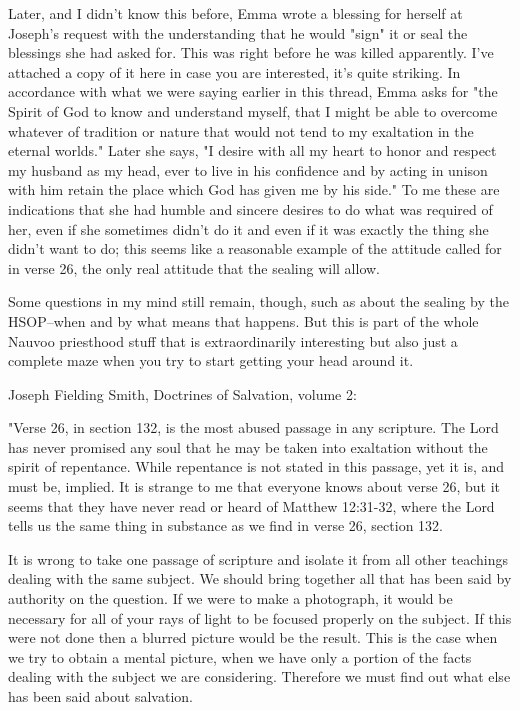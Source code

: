 \begin{compactdesc}
\begin{compactdesc}
					Later, and I didn't know this before, Emma wrote a blessing for herself at Joseph's request with the understanding that he would "sign" it or seal the blessings she had asked for. This was right before he was killed apparently. I've attached a copy of it here in case you are interested, it's quite striking. In accordance with what we were saying earlier in this thread, Emma asks for "the Spirit of God to know and understand myself, that I might be able to overcome whatever of tradition or nature that would not tend to my exaltation in the eternal worlds." Later she says, "I desire with all my heart to honor and respect my husband as my head, ever to live in his confidence and by acting in unison with him retain the place which God has given me by his side." To me these are indications that she had humble and sincere desires to do what was required of her, even if she sometimes didn't do it and even if it was exactly the thing she didn't want to do; this seems like a reasonable example of the attitude called for in verse 26, the only real attitude that the sealing will allow.

					Some questions in my mind still remain, though, such as about the sealing by the HSOP--when and by what means that happens. But this is part of the whole Nauvoo priesthood stuff that is extraordinarily interesting but also just a complete maze when you try to start getting your head around it.

					Joseph Fielding Smith, Doctrines of Salvation, volume 2:

					"Verse 26, in section 132, is the most abused passage in any scripture. The Lord has never promised any soul that he may be taken into exaltation without the spirit of repentance. While repentance is not stated in this passage, yet it is, and must be, implied. It is strange to me that everyone knows about verse 26, but it seems that they have never read or heard of Matthew 12:31-32, where the Lord tells us the same thing in substance as we find in verse 26, section 132.

					It is wrong to take one passage of scripture and isolate it from all other teachings dealing with the same subject. We should bring together all that has been said by authority on the question. If we were to make a photograph, it would be necessary for all of your rays of light to be focused properly on the subject. If this were not done then a blurred picture would be the result. This is the case when we try to obtain a mental picture, when we have only a portion of the facts dealing with the subject we are considering. Therefore we must find out what else has been said about salvation.


\end{compactdesc}
\end{compactdesc}
